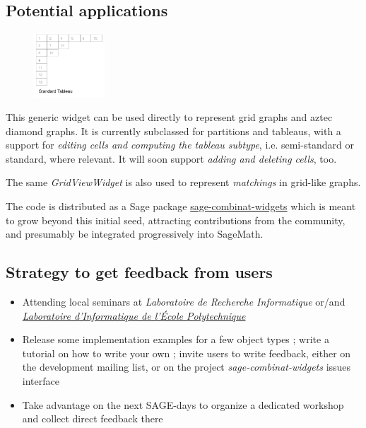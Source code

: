 \documentclass{deliverablereport}
\begin{document}
\subsection{Potential applications}

\begin{figure}
    \begin{center}
      \includegraphics[width=100px]{images/tableauwidget}
\end{center}
\end{figure}

This generic widget can be used directly to represent grid graphs and
aztec diamond graphs. It is currently subclassed for partitions
and tableaus, with a support for \emph{editing cells and computing the
tableau subtype}, i.e. semi-standard or standard, where relevant. It
will soon support \emph{adding and deleting cells}, too.

The same \emph{GridViewWidget} is also used to represent \emph{matchings} in grid-like
graphs.


The code is distributed as a Sage package
\href{https://github.com/sagemath/sage-combinat-widgets/}{sage-combinat-widgets}
which is meant to grow beyond this initial seed, attracting
contributions from the community, and presumably be integrated
progressively into SageMath.

\subsection{Strategy to get feedback from users}

\begin{itemize}
  \item Attending local seminars at \emph{Laboratoire de Recherche Informatique} or/and \emph{\href{https://www.lix.polytechnique.fr/}{Laboratoire d'Informatique de l'École Polytechnique}}
  \item Release some implementation examples for a few object types ; write a tutorial on how to write your own ; invite users to write feedback, either on the development mailing list, or on the  project \emph{sage-combinat-widgets} issues interface
  \item Take advantage on the next SAGE-days to organize a dedicated workshop and collect direct feedback there
\end{itemize}
\end{document}
